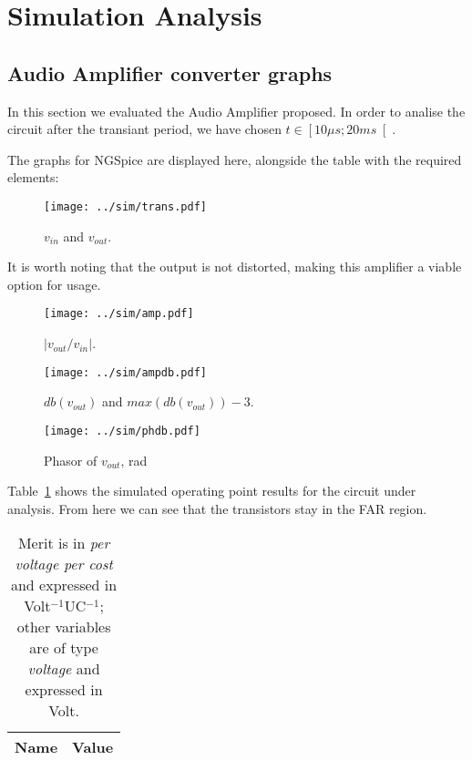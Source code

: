 \section{Simulation Analysis }
\label{sec:simulation}

\subsection{Audio Amplifier converter graphs}

In this section we evaluated the Audio Amplifier proposed.
In order to analise the circuit after the transiant period, we have chosen $t \in \left[ 10 \mu s; 20 ms \right[ $.

The graphs for NGSpice are displayed here, alongside the table with the required elements:

\begin{figure}[h] \centering
\vspace{-3cm}
\texttt{[image: ../sim/trans.pdf]}
\caption{$v_{in}$ and $v_{out}$.}
\label{fig:SIM_TRANS}
\end{figure}

It is worth noting that the output is not distorted, making this amplifier a viable option for usage.

\begin{figure}[h] \centering
\vspace{-3cm}
\texttt{[image: ../sim/amp.pdf]}
\caption{$ \left | v_{out}/v_{in} \right |$.}
\label{fig:SIM_ENV}
\end{figure}

\newpage

\begin{figure}[h] \centering
\vspace{-3cm}
\texttt{[image: ../sim/ampdb.pdf]}
\caption{$db(v_{out})$ and $max(db(v_{out}))-3$.}
\label{fig:SIM_OUT}
\end{figure}

\begin{figure}[h] \centering
\vspace{-3cm}
\texttt{[image: ../sim/phdb.pdf]}
\caption{Phasor of $v_{out}$, rad}
\label{fig:SIM_OUT-12}
\end{figure}

\newpage

Table~\ref{tab:SIM_DC} shows the simulated operating point results for the circuit under analysis. From here we can see that the transistors stay in the FAR region.
\begin{table}[h]
  \centering
  \begin{tabular}{|l|r|}
    \hline    
    {\bf Name} & {\bf Value} \\ \hline
    
  \end{tabular}
  \caption{Merit is in {\it per voltage per cost} and expressed in Volt$^{-1}$UC$^{-1}$; other variables are of type {\it voltage} and expressed in Volt.}
  \label{tab:SIM_DC}
\end{table}

